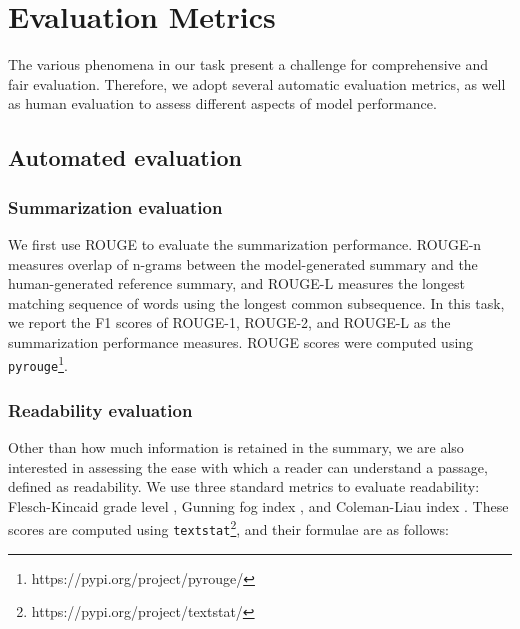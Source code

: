 \documentclass[letterpaper, table]{article} %
\begin{document}
\section{Evaluation Metrics}
\label{evaluation_metrics}

The various phenomena in our task present a challenge for comprehensive and fair evaluation. Therefore, we adopt several automatic evaluation metrics, as well as human evaluation to assess different aspects of model performance. %
\subsection{Automated evaluation}
\subsubsection{Summarization evaluation}
We first use ROUGE \cite{lin2004rouge} to evaluate the summarization performance. 
ROUGE-n measures overlap of n-grams between the model-generated summary and the human-generated reference summary, and ROUGE-L measures the longest matching sequence of words using the longest common subsequence. 
In this task, we report the F1 scores of ROUGE-1, ROUGE-2, and ROUGE-L as the summarization performance measures. ROUGE scores were computed using \texttt{pyrouge}\footnote{https://pypi.org/project/pyrouge/}.
\subsubsection{Readability evaluation} Other than how much information is retained in the summary, we are also interested in assessing the ease with which a reader can understand a passage, defined as readability. We use three standard metrics to evaluate readability: Flesch-Kincaid grade level \cite{kincaid1975derivation}, Gunning fog index \cite{gunning1952technique}, and Coleman-Liau index \cite{coleman1975computer}.
These scores are computed using \texttt{textstat}\footnote{https://pypi.org/project/textstat/}, and their formulae are as follows:
\end{document}
